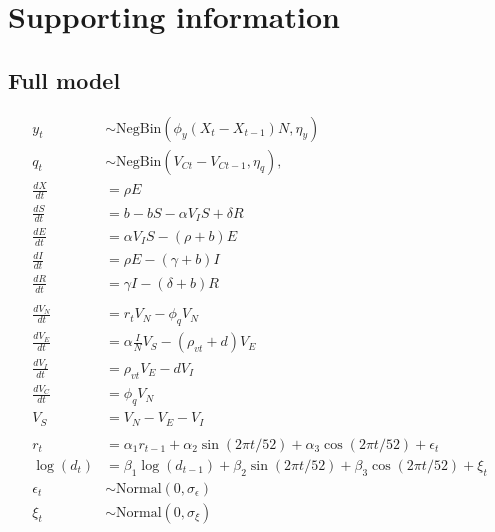 \documentclass[10pt,letterpaper]{article}
\begin{document}
\section*{Supporting information}

\subsection*{Full model}


\begin{align}
y_t & \sim \text{NegBin}(\phi_y  (X_t - X_{t-1})N, \eta_y)\\
q_t & \sim \text{NegBin}(V_{Ct} - V_{Ct-1}, \eta_q),
\\ 
\frac{dX}{dt} &= \rho E \\
\frac{dS}{dt} &= b - bS - \alpha V_{I} S + \delta R\\
\frac{dE}{dt} &= \alpha V_{I}S - (\rho + b)E\\
\frac{dI}{dt} &= \rho E - (\gamma + b)I\\
\frac{dR}{dt} &= \gamma I - (\delta + b)R\\
\\
\frac{dV_N}{dt} & = r_t V_N - \phi_q V_N\\
\frac{dV_E}{dt} &= \alpha \frac{I}{N} V_S - (\rho_{vt} + d)V_E\\
\frac{dV_I}{dt} &= \rho_{vt} V_E - d V_I\\
\frac{dV_C}{dt} & = \phi_q V_N\\
V_S &= V_N - V_E - V_I\\
\\
r_t & = \alpha_{1}r_{t-1} + \alpha_2 \sin(2\pi t / 52) + \alpha_3 \cos(2\pi t / 52) + \epsilon_t\\
\log(d_{t}) & = \beta_{1}\log(d_{t-1}) + \beta_2 \sin(2\pi t / 52) + \beta_3 \cos(2\pi t / 52) + \xi_t\\
\epsilon_t & \sim \text{Normal}(0, \sigma_{\epsilon})\\
\xi_t & \sim \text{Normal}(0, \sigma_{\xi})
\end{align}
\end{document}
